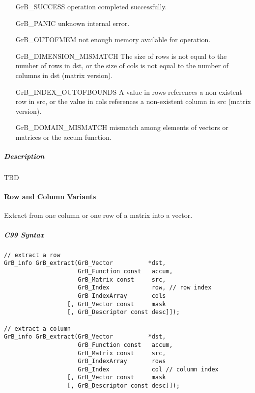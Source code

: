 \begin{itemize}[leftmargin=2.1in]
\item[{\sf GrB\_SUCCESS}] 	operation completed successfully.
\item[{\sf GrB\_PANIC}]	    unknown internal error.
\item[{\sf GrB\_OUTOFMEM}]	not enough memory available for operation.
\item[{\sf GrB\_DIMENSION\_MISMATCH}] 
        The size of rows is not equal to the number of rows in dst, or
        the size of cols is not equal to the number of columns in dst (matrix version).
\item[{\sf GrB\_INDEX\_OUTOFBOUNDS}]
        A value in rows references a non-existent row in src, or
	    the value in cols references a non-existent column in src (matrix version).
\item[\sf GrB\_DOMAIN\_MISMATCH]  
	   mismatch among elements of vectors or matrices or the accum function. 
\end{itemize}


\subparagraph{Description}

TBD

\paragraph{Row and Column Variants}

Extract from one column or one row of a matrix into a vector. 



\subparagraph{C99 Syntax}

\begin{verbatim}
// extract a row
GrB_info GrB_extract(GrB_Vector          *dst, 
                     GrB_Function const   accum,
                     GrB_Matrix const     src,
                     GrB_Index            row, // row index
                     GrB_IndexArray       cols
                  [, GrB_Vector const     mask
                  [, GrB_Descriptor const desc]]);

// extract a column
GrB_info GrB_extract(GrB_Vector          *dst, 
                     GrB_Function const   accum,
                     GrB_Matrix const     src, 
                     GrB_IndexArray       rows
                     GrB_Index            col // column index
                  [, GrB_Vector const     mask
                  [, GrB_Descriptor const desc]]);
\end{verbatim}

